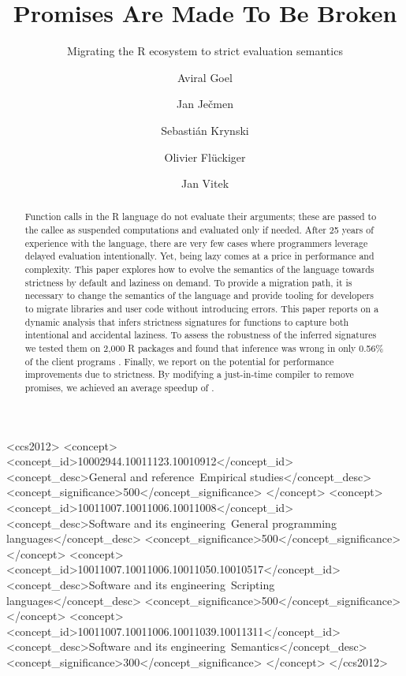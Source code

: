 \documentclass[review,nonacm,screen,acmsmall,anonymous=true]{acmart}
\begin{document}
\title{Promises Are Made To Be Broken}
\subtitle{Migrating the R ecosystem to strict evaluation semantics}

\author{Aviral Goel}
\author{Jan Ječmen}
\author{Sebastián Krynski}
\author{Olivier Flückiger}
\author{Jan Vitek}
\authorsaddresses{}
\renewcommand{\shortauthors}{Goel, et al.}

\begin{abstract}
  Function calls in the R language do not evaluate their arguments; these are
  passed to the callee as suspended computations and evaluated only if needed.
  After 25 years of experience with the language, there are very few cases where
  programmers leverage delayed evaluation intentionally. Yet, being lazy comes
  at a price in performance and complexity. This paper explores how to evolve
  the semantics of the language towards strictness by default and laziness on
  demand. To provide a migration path, it is necessary to change the semantics
  of the language and provide tooling for developers to migrate libraries and
  user code without introducing errors. This paper reports on a dynamic analysis
  that infers strictness signatures for functions to capture both intentional
  and accidental laziness. To assess the robustness of the inferred signatures
  we tested them on 2,000 R packages and found that inference was wrong in only
  0.56\% of the client programs . Finally, we report on the potential for
  performance improvements due to strictness. By modifying a just-in-time
  compiler to remove promises, we achieved an average speedup of
  \speedupRshStrict.
\end{abstract}

\begin{CCSXML}
<ccs2012>
<concept>
<concept_id>10002944.10011123.10010912</concept_id>
<concept_desc>General and reference~Empirical studies</concept_desc>
<concept_significance>500</concept_significance>
</concept>
<concept>
<concept_id>10011007.10011006.10011008</concept_id>
<concept_desc>Software and its engineering~General programming languages</concept_desc>
<concept_significance>500</concept_significance>
</concept>
<concept>
<concept_id>10011007.10011006.10011050.10010517</concept_id>
<concept_desc>Software and its engineering~Scripting languages</concept_desc>
<concept_significance>500</concept_significance>
</concept>
<concept>
<concept_id>10011007.10011006.10011039.10011311</concept_id>
<concept_desc>Software and its engineering~Semantics</concept_desc>
<concept_significance>300</concept_significance>
</concept>
</ccs2012>
\end{CCSXML}
\end{document}
